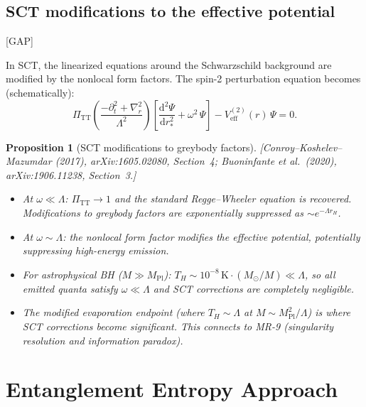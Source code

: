 \documentclass[12pt,a4paper]{article}
\newtheorem{proposition}{Proposition}[section]
\theoremstyle{definition}
\theoremstyle{remark}
\newcommand{\dd}{\mathrm{d}}
\newcommand{\fromlit}[1]{\textcolor{blue!70!black}{\textsf{[#1]}}}
\newcommand{\gap}{\textcolor{red!80!black}{\textsf{[GAP]}}}
\begin{document}
\subsection{SCT modifications to the effective potential}
\gap

In SCT, the linearized equations around the Schwarzschild background
are modified by the nonlocal form factors.  The spin-2 perturbation
equation becomes (schematically):
\begin{equation}\label{eq:RW-SCT}
  \Pi_{\mathrm{TT}}\!\left(\frac{-\partial_t^2 + \nabla_r^2}
  {\Lambda^2}\right)\!
  \left[\frac{\dd^2 \Psi}{\dd r_*^2}
  + \omega^2\,\Psi\right]
  - V^{(2)}_{\mathrm{eff}}(r)\,\Psi = 0.
\end{equation}

\begin{proposition}[SCT modifications to greybody factors]
\label{prop:greybody}
\fromlit{Conroy--Koshelev--Mazumdar (2017), arXiv:1605.02080, Section~4;
Buoninfante et al.\ (2020), arXiv:1906.11238, Section~3.}
\begin{itemize}[nosep]
  \item At $\omega \ll \Lambda$: $\Pi_{\mathrm{TT}} \to 1$ and the
    standard Regge--Wheeler equation is recovered.  Modifications to
    greybody factors are exponentially suppressed as
    $\sim e^{-\Lambda r_H}$.
  \item At $\omega \sim \Lambda$: the nonlocal form factor modifies
    the effective potential, potentially suppressing high-energy
    emission.
  \item For astrophysical BH ($M \gg M_{\mathrm{Pl}}$):
    $T_H \sim 10^{-8}\,\mathrm{K} \cdot (M_\odot/M) \ll \Lambda$,
    so all emitted quanta satisfy $\omega \ll \Lambda$ and SCT
    corrections are completely negligible.
  \item The modified evaporation endpoint (where $T_H \sim \Lambda$
    at $M \sim M_{\mathrm{Pl}}^2/\Lambda$) is where SCT corrections
    become significant.  This connects to MR-9 (singularity
    resolution and information paradox).
\end{itemize}
\end{proposition}


\section{Entanglement Entropy Approach}
\label{sec:entanglement}
\end{document}
